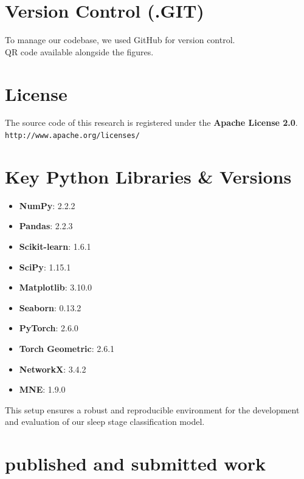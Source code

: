 \section{Version Control (.GIT)}
To manage our codebase, we used GitHub for version control.\\
QR code available alongside the figures.

\section{License}
The source code of this research is registered under the \textbf{Apache License 2.0}.\\
\texttt{http://www.apache.org/licenses/}

\section{Key Python Libraries \& Versions}
\begin{itemize}
	\item \textbf{NumPy}: 2.2.2
	\item \textbf{Pandas}: 2.2.3
	\item \textbf{Scikit-learn}: 1.6.1
	\item \textbf{SciPy}: 1.15.1
	\item \textbf{Matplotlib}: 3.10.0
	\item \textbf{Seaborn}: 0.13.2
	\item \textbf{PyTorch}: 2.6.0
	\item \textbf{Torch Geometric}: 2.6.1
	\item \textbf{NetworkX}: 3.4.2
	\item \textbf{MNE}: 1.9.0
\end{itemize}
This setup ensures a robust and reproducible environment for the development and evaluation of our sleep stage classification model.


\section{published and submitted work }




